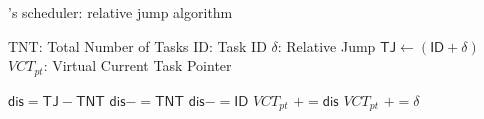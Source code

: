 


\begin{algorithm}[t]
	\caption{\sys's scheduler: relative jump algorithm}
	\label{algo:relativeJump}
	\scriptsize
	\begin{algorithmic}[1]
			\State \textsf{TNT}: Total Number of Tasks
			\State \textsf{ID}: Task ID
			\State \textsf{$\delta$}: Relative Jump
			\State $\textsf{TJ} \leftarrow (\textsf{ID} + \delta )$ 
			\State \textsf{\textsf{$VCT_{pt}$}}: Virtual Current Task Pointer

				\State $\textsf{dis} = \textsf{TJ} - \textsf{TNT}$
					\State $\textsf{dis} -= \textsf{TNT}$
				\EndWhile
				\State $\textsf{dis} -= \textsf{ID}$
				\State \textsf{$VCT_{pt}$} $+= \textsf{dis}$
			\Else
				\State \textsf{$VCT_{pt}$} $+= \delta $

			\EndIf
	\end{algorithmic}
\end{algorithm}